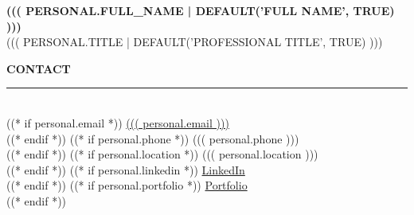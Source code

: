 \documentclass[11pt,a4paper]{article}
\begin{document}
\noindent
{}

\noindent
\begin{minipage}[t]{0.35\textwidth}
\color{white}
\vspace{12mm}
\hspace{8mm}
\begin{minipage}[t]{0.80\textwidth}

\vspace{10mm}
{\fontsize{14}{16}\selectfont\color{gold}\bfseries\MakeUppercase{((( personal.full_name | default('Full Name', true) )))}}\\[6pt]
{\fontsize{8}{10}\selectfont\color{white!60}\MakeUppercase{((( personal.title | default('Professional Title', true) )))}}

\vspace{10mm}

{\fontsize{9}{11}\selectfont\color{gold}\bfseries\MakeUppercase{Contact}}\\[2pt]
{\color{gold!30}\rule{\linewidth}{0.4pt}}\\[10pt]
((* if personal.email *))
{\small\color{gold}\faEnvelope\hspace{8pt}\color{white!90}\href{mailto:((( personal.email )))}{((( personal.email ))) }}\\[10pt]
((* endif *))
((* if personal.phone *))
{\small\color{gold}\faPhone\hspace{8pt}\color{white!90} ((( personal.phone ))) }\\[10pt]
((* endif *))
((* if personal.location *))
{\small\color{gold}\faMapMarker*\hspace{8pt}\color{white!90} ((( personal.location ))) }\\[10pt]
((* endif *))
((* if personal.linkedin *))
{\small\color{gold}\faLinkedin\hspace{8pt}\color{white!90}\href{((* if 'http' not in personal.linkedin *))https://((* endif *))((( personal.linkedin )))}{LinkedIn }}\\[10pt]
((* endif *))
((* if personal.portfolio *))
{\small\color{gold}\faGlobe\hspace{8pt}\color{white!90}\href{((* if 'http' not in personal.portfolio *))https://((* endif *))((( personal.portfolio )))}{Portfolio }}\\[10pt]
((* endif *))


\end{minipage}
\end{minipage}
\end{document}
